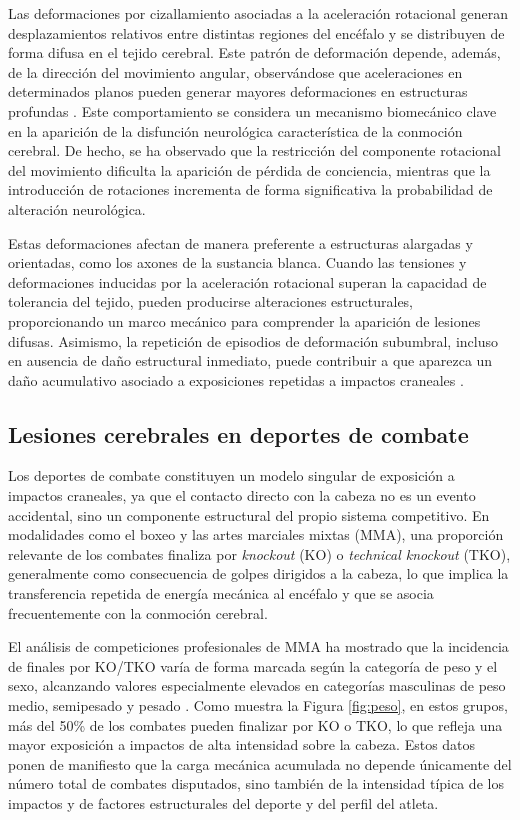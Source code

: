 Las deformaciones por cizallamiento asociadas a la aceleración rotacional generan desplazamientos relativos entre distintas regiones del encéfalo y se distribuyen de forma difusa en el tejido cerebral. Este patrón de deformación depende, además, de la dirección del movimiento angular, observándose que aceleraciones en determinados planos pueden generar mayores deformaciones en estructuras profundas \cite{Meaney2011Biomechanics}. Este comportamiento se considera un mecanismo biomecánico clave en la aparición de la disfunción neurológica característica de la conmoción cerebral. De hecho, se ha observado que la restricción del componente rotacional del movimiento dificulta la aparición de pérdida de conciencia, mientras que la introducción de rotaciones incrementa de forma significativa la probabilidad de alteración neurológica.

Estas deformaciones afectan de manera preferente a estructuras alargadas y orientadas, como los axones de la sustancia blanca. Cuando las tensiones y deformaciones inducidas por la aceleración rotacional superan la capacidad de tolerancia del tejido, pueden producirse alteraciones estructurales, proporcionando un marco mecánico para comprender la aparición de lesiones difusas. Asimismo, la repetición de episodios de deformación subumbral, incluso en ausencia de daño estructural inmediato, puede contribuir a que aparezca un daño acumulativo asociado a exposiciones repetidas a impactos craneales \cite{Meaney2011Biomechanics}. 


\subsection{Lesiones cerebrales en deportes de combate}

Los deportes de combate constituyen un modelo singular de exposición a impactos craneales, ya que el contacto directo con la cabeza no es un evento accidental, sino un componente estructural del propio sistema competitivo. En modalidades como el boxeo y las artes marciales mixtas (MMA), una proporción relevante de los combates finaliza por \textit{knockout} (KO) o \textit{technical knockout} (TKO), generalmente como consecuencia de golpes dirigidos a la cabeza, lo que implica la transferencia repetida de energía mecánica al encéfalo \cite{Follmer2019,Fares2021} y que se asocia frecuentemente con la conmoción cerebral.

El análisis de competiciones profesionales de MMA ha mostrado que la incidencia de finales por KO/TKO varía de forma marcada según la categoría de peso y el sexo, alcanzando valores especialmente elevados en categorías masculinas de peso medio, semipesado y pesado \cite{Follmer2019}. Como muestra la Figura \ref{fig:peso}, en estos grupos, más del 50\% de los combates pueden finalizar por KO o TKO, lo que refleja una mayor exposición a impactos de alta intensidad sobre la cabeza. Estos datos ponen de manifiesto que la carga mecánica acumulada no depende únicamente del número total de combates disputados, sino también de la intensidad típica de los impactos y de factores estructurales del deporte y del perfil del atleta.

